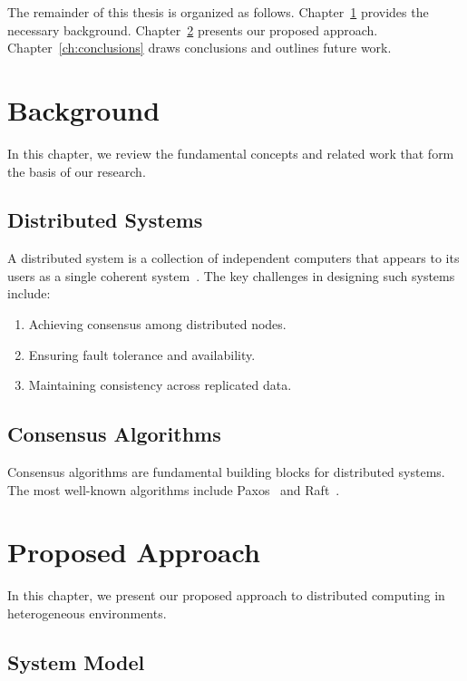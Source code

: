 \documentclass[master,english,lof,lot]{tvthesis}
\begin{document}
The remainder of this thesis is organized as follows. Chapter~\ref{ch:background}
provides the necessary background. Chapter~\ref{ch:proposal} presents our
proposed approach. Chapter~\ref{ch:conclusions} draws conclusions and outlines
future work.



\chapter{Background}
\label{ch:background}

In this chapter, we review the fundamental concepts and related work that
form the basis of our research.

\section{Distributed Systems}

A distributed system is a collection of independent computers that appears to
its users as a single coherent system~\cite{tanenbaum2007}. The key challenges
in designing such systems include:
\begin{enumerate}
    \item Achieving consensus among distributed nodes.
    \item Ensuring fault tolerance and availability.
    \item Maintaining consistency across replicated data.
\end{enumerate}

\section{Consensus Algorithms}

Consensus algorithms are fundamental building blocks for distributed
systems. The most well-known algorithms include Paxos~\cite{lamport1998}
and Raft~\cite{ongaro2014}.

\lipsum[1-2]



\chapter{Proposed Approach}
\label{ch:proposal}

In this chapter, we present our proposed approach to distributed computing
in heterogeneous environments.

\section{System Model}
\end{document}
